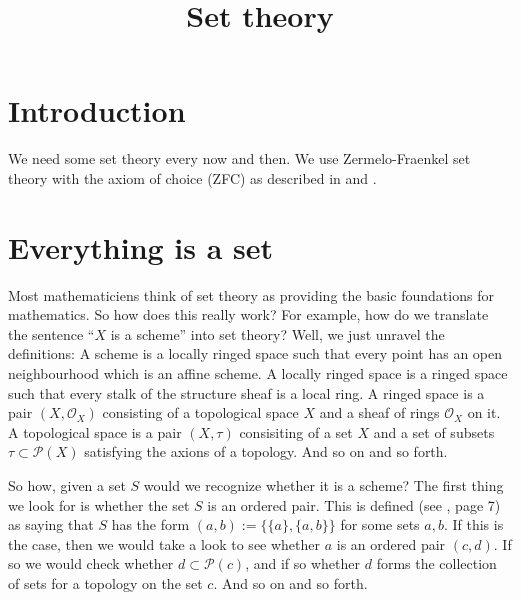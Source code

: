 

%


\title{Set theory}


\maketitle

\tableofcontents

\section{Introduction}
\label{section-introduction}

\noindent
We need some set theory every now and then. We use Zermelo-Fraenkel set theory
with the axiom of choice (ZFC) as described in \cite{Kunen} and \cite{Jech}.

\section{Everything is a set}
\label{section-sets-everything}

\noindent
Most mathematiciens think of set theory as providing the basic
foundations for mathematics. So how does this really work?
For example, how do we translate the sentence
``$X$ is a scheme'' into set theory? Well, we just unravel the
definitions: A scheme is a locally ringed space such that every
point has an open neighbourhood which is an affine scheme. 
A locally ringed space is a ringed space such that every stalk
of the structure sheaf is a local ring. A ringed space is
a pair $(X, \mathcal{O}_X)$ consisting of a topological space
$X$ and a sheaf of rings $\mathcal{O}_X$ on it. A topological
space is a pair $(X, \tau)$ consisiting of a set
$X$ and a set of subsets $\tau \subset \mathcal{P}(X)$ 
satisfying the axions of a topology. And so on and
so forth.

\medskip\noindent
So how, given a set $S$ would we recognize whether it is a scheme?
The first thing we look for is whether the set $S$ is an ordered pair.
This is defined (see \cite{Jech}, page 7) as saying that $S$
has the form $(a,b) := \{\{a\},\{a,b\}\}$ for some sets $a, b$. If this is
the case, then we would take a look to see whether $a$ is an
ordered pair $(c,d)$. If so we would check whether 
$d \subset \mathcal{P}(c)$, and if so whether $d$ forms the collection
of sets for a topology on the set $c$. And so on and so forth.

